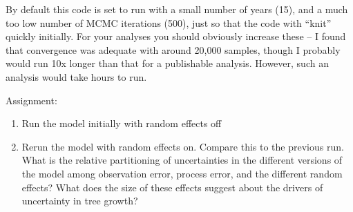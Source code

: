\documentclass[]{article}
\newenvironment{Shaded}{\begin{snugshade}}{\end{snugshade}}
\newcommand{\CommentTok}[1]{\textcolor[rgb]{0.56,0.35,0.01}{\textit{#1}}}
\newcommand{\DataTypeTok}[1]{\textcolor[rgb]{0.13,0.29,0.53}{#1}}
\newcommand{\DecValTok}[1]{\textcolor[rgb]{0.00,0.00,0.81}{#1}}
\newcommand{\KeywordTok}[1]{\textcolor[rgb]{0.13,0.29,0.53}{\textbf{#1}}}
\newcommand{\NormalTok}[1]{#1}
\newcommand{\OperatorTok}[1]{\textcolor[rgb]{0.81,0.36,0.00}{\textbf{#1}}}
\newcommand{\OtherTok}[1]{\textcolor[rgb]{0.56,0.35,0.01}{#1}}
\newcommand{\StringTok}[1]{\textcolor[rgb]{0.31,0.60,0.02}{#1}}
\begin{document}
\begin{Shaded}
\end{Shaded}

By default this code is set to run with a small number of years (15),
and a much too low number of MCMC iterations (500), just so that the
code with ``knit'' quickly initially. For your analyses you should
obviously increase these -- I found that convergence was adequate with
around 20,000 samples, though I probably would run 10x longer than that
for a publishable analysis. However, such an analysis would take hours
to run.

Assignment:

\begin{enumerate}
\def\labelenumi{\arabic{enumi}.}
\item
  Run the model initially with random effects off
\item
  Rerun the model with random effects on. Compare this to the previous
  run. What is the relative partitioning of uncertainties in the
  different versions of the model among observation error, process
  error, and the different random effects? What does the size of these
  effects suggest about the drivers of uncertainty in tree growth?
\end{enumerate}
\end{document}

